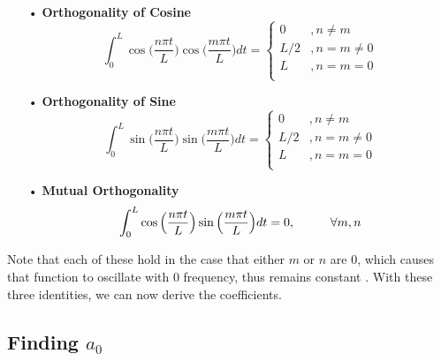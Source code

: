 \documentclass[12pt,letterpaper]{article}
\begin{document}
\begin{enumerate}
\item[•]\textbf{Orthogonality of Cosine}
\begin{equation}
\label{cos orth}
\int_{0}^{L} \cos\Big(\frac{n\pi t}{L}\Big) \cos\Big(\frac{m\pi t}{L}\Big) dt = 
	\left\{
        \begin{array}{ll}
            0 	&, n \neq m \\
            L/2	&, n = m \neq 0 \\
            L 	&, n = m = 0\\
        \end{array}
    \right.
\end{equation}
\item[•]\textbf{Orthogonality of Sine}
\begin{equation}
\label{sin orth}
\int_{0}^{L} \sin\Big(\frac{n\pi t}{L}\Big) \sin\Big(\frac{m\pi t}{L}\Big) dt = 
	\left\{
        \begin{array}{ll}
            0 	&, n \neq m \\
            L/2	&, n = m \neq 0 \\
            L 	&, n = m = 0\\
        \end{array}
    \right.
\end{equation}
\item[•]\textbf{Mutual Orthogonality}
\begin{equation}
\label{mutual orth}
\int_{0}^{L} \cos\Big(\frac{n\pi t}{L}\Big) \sin\Big(\frac{m\pi t}{L}\Big) dt = 0 ,
\hspace*{1cm} \forall m,n
\end{equation}
\end{enumerate}
Note that each of these hold in the case that either $m$ or $n$ are $0$, which causes that function to oscillate with $0$ frequency, thus remains constant \cite{Tolstov}. With these three identities, we can now derive the coefficients. 


\subsection*{Finding $a_0$}
\end{document}

